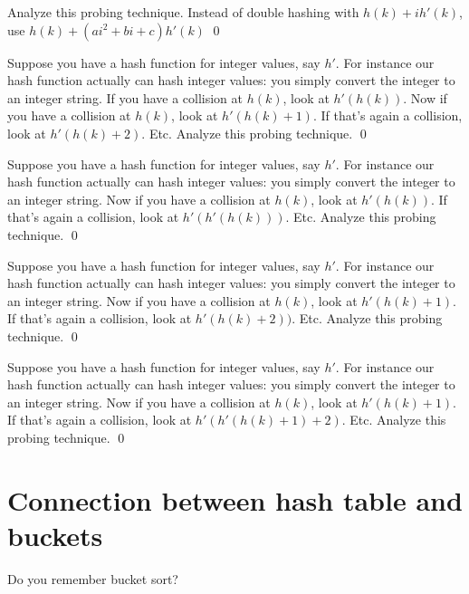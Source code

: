 \begin{ex}
Analyze this probing technique.
Instead of double hashing with $h(k) + ih'(k)$,
use $h(k) + (ai^2 + bi + c)h'(k)$
\qed
\end{ex}


\begin{ex}
Suppose you have a hash function for integer values, say $h'$.
For instance our hash function
actually can hash integer values: you simply convert the 
integer to an integer string. 
If you have a collision at $h(k)$, look at $h'(h(k))$.
Now if you have a collision at $h(k)$, look at $h'(h(k) + 1)$.
If that's again a collision, look at $h'(h(k) + 2)$.
Etc.
Analyze this probing technique.
\qed
\end{ex}

\begin{ex}
Suppose you have a hash function for integer values, say $h'$.
For instance our hash function
actually can hash integer values: you simply convert the 
integer to an integer string. 
Now if you have a collision at $h(k)$, look at $h'(h(k))$.
If that's again a collision, look at $h'(h'(h(k)))$.
Etc.
Analyze this probing technique.
\qed
\end{ex}

\begin{ex}
Suppose you have a hash function for integer values, say $h'$.
For instance our hash function
actually can hash integer values: you simply convert the 
integer to an integer string. 
Now if you have a collision at $h(k)$, look at $h'(h(k) + 1)$.
If that's again a collision, look at $h'(h(k) + 2))$.
Etc.
Analyze this probing technique.
\qed
\end{ex}

\begin{ex}
Suppose you have a hash function for integer values, say $h'$.
For instance our hash function
actually can hash integer values: you simply convert the 
integer to an integer string. 
Now if you have a collision at $h(k)$, look at $h'(h(k) + 1)$.
If that's again a collision, look at $h'(h'(h(k) + 1) + 2)$.
Etc.
Analyze this probing technique.
\qed
\end{ex}




\newpage
\section{Connection between hash table and buckets}

Do you remember bucket sort?


